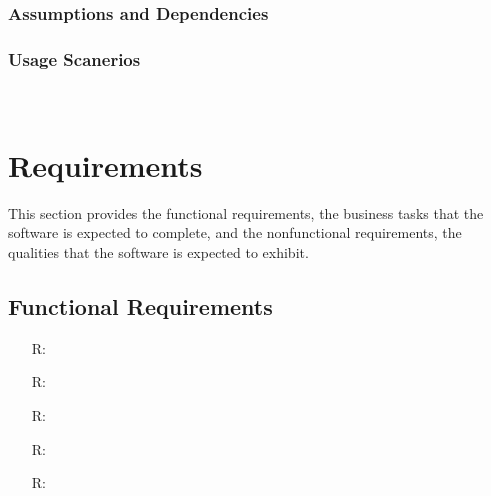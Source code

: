 \documentclass[12pt]{article}
\newcounter{reqnum} %
\begin{document}
\subsubsection{Assumptions and Dependencies} \label{sec_assumpt}

\subsubsection{Usage Scanerios}


~\newpage

\section{Requirements}

This section provides the functional requirements, the business tasks that the
software is expected to complete, and the nonfunctional requirements, the
qualities that the software is expected to exhibit.

\subsection{Functional Requirements}

\noindent \begin{itemize}

\item[R\refstepcounter{reqnum}\thereqnum \label{R_Inputs}:] 

\item[R\refstepcounter{reqnum}\thereqnum \label{R_OutputInputs}:] 

\item[R\refstepcounter{reqnum}\thereqnum \label{R_Calculate}:] 

\item[R\refstepcounter{reqnum}\thereqnum \label{R_VerifyOutput}:]

\item[R\refstepcounter{reqnum}\thereqnum \label{R_Output}:] 

\end{itemize}

\end{document}
